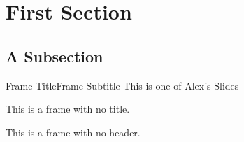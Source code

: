 \section{First Section}

\subsection{A Subsection}
	\begin{frame}{Frame Title}{Frame Subtitle}
		This is one of Alex's Slides

	\end{frame}
    

    \begin{frame}{\null}
        This is a frame with no title.
    \end{frame}

    \begin{frame}
        This is a frame with no header.
    \end{frame}